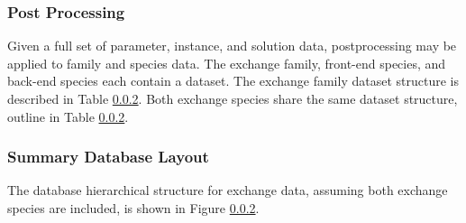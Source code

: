 
\subsubsection{Post Processing}

Given a full set of parameter, instance, and solution data, postprocessing may
be applied to family and species data. The exchange family, front-end species,
and back-end species each contain a  dataset. The exchange
family dataset structure is described in Table \ref{}. Both exchange species
share the same dataset structure, outline in Table \ref{}.


\subsubsection{Summary Database Layout}

The database hierarchical structure for exchange data, assuming both exchange
species are included, is shown in Figure \ref{}.
